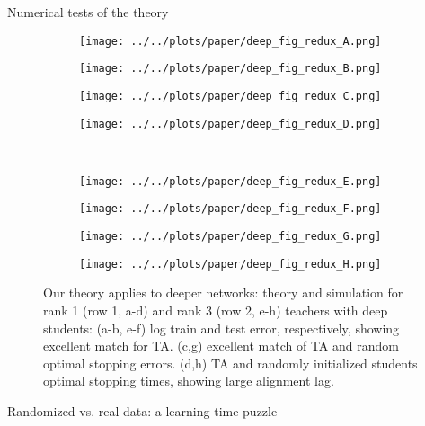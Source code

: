 \documentclass[final]{beamer}
\begin{document}
\begin{frame}[t]{}
\begin{columns}
\begin{column}[t]{0.248\textwidth}
\begin{block}{\large Numerical tests of the theory}
\begin{figure}
\vspace{-0.5em}
\centering
\begin{subfigure}[t]{0.2\textwidth}
\texttt{[image: ../../plots/paper/deep\_fig\_redux\_A.png]}
\label{deep_fig_a}
\end{subfigure}%
\begin{subfigure}[t]{0.285\textwidth}
\texttt{[image: ../../plots/paper/deep\_fig\_redux\_B.png]}
\label{deep_fig_b}
\end{subfigure}%
\begin{subfigure}[t]{0.2\textwidth}
\texttt{[image: ../../plots/paper/deep\_fig\_redux\_C.png]}
\label{deep_fig_c}
\end{subfigure}%
\begin{subfigure}[t]{0.2\textwidth}
\texttt{[image: ../../plots/paper/deep\_fig\_redux\_D.png]}
\label{deep_fig_d}
\end{subfigure}\\[-1em]
\begin{subfigure}[t]{0.2\textwidth}
\texttt{[image: ../../plots/paper/deep\_fig\_redux\_E.png]}
\label{deep_fig_e}
\end{subfigure}%
\begin{subfigure}[t]{0.285\textwidth}
\texttt{[image: ../../plots/paper/deep\_fig\_redux\_F.png]}
\label{deep_fig_f}
\end{subfigure}%
\begin{subfigure}[t]{0.2\textwidth}
\texttt{[image: ../../plots/paper/deep\_fig\_redux\_G.png]}
\label{deep_fig_g}
\end{subfigure}%
\begin{subfigure}[t]{0.2\textwidth}
\texttt{[image: ../../plots/paper/deep\_fig\_redux\_H.png]}
\label{deep_fig_h}
\end{subfigure}
\vspace{-1em}
\caption{Our theory applies to deeper networks: theory and simulation for rank 1 (row 1, a-d) and rank 3 (row 2, e-h) teachers with deep students: (a-b, e-f) log train and test error, respectively, showing excellent match for TA. (c,g) excellent match of TA and random optimal stopping errors. (d,h) TA and randomly initialized students optimal stopping times, showing large alignment lag.}
\label{deeper_results_fig}
\vspace{-1em}
\end{figure}
\end{block}
\begin{block}{\large Randomized vs. real data: a learning time puzzle}

\end{block}
\end{column}
\end{columns}
\end{frame}
\end{document}
